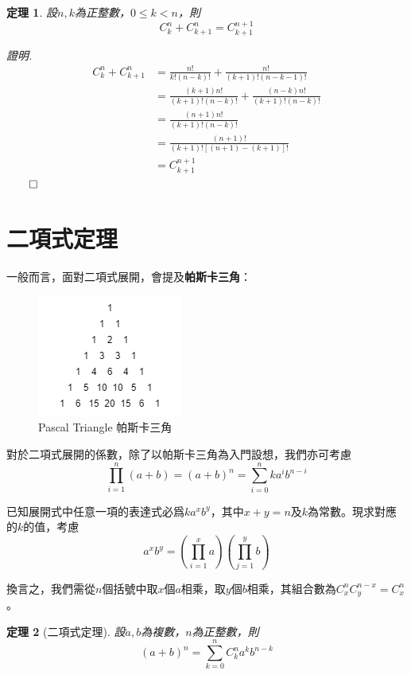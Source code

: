 \documentclass[12pt]{article}
\newtheorem*{theorem}{定理}
\renewenvironment*{proof}{\textit{證明.}}{\hfill$\qed$}
\begin{document}
    \begin{theorem}
        設$n,k$為正整數，$0\leq k< n$，則$$C_k^n+C_{k+1}^n=C_{k+1}^{n+1}$$
    \end{theorem}

    \begin{proof}
        \begin{align*}
            C_k^n+C_{k+1}^n&=\frac{n!}{k!(n-k)!}+\frac{n!}{(k+1)!(n-k-1)!}\\
            &=\frac{(k+1)n!}{(k+1)!(n-k)!}+\frac{(n-k)n!}{(k+1)!(n-k)!}\\
            &=\frac{(n+1)n!}{(k+1)!(n-k)!}\\
            &=\frac{(n+1)!}{(k+1)![(n+1)-(k+1)]!}\\
            &=C_{k+1}^{n+1}
        \end{align*}
    \end{proof}

    \section*{二項式定理}

    一般而言，面對二項式展開，會提及\textbf{帕斯卡三角}：

    \begin{figure}[H]
        \centering
        \includegraphics[scale=1]{pascal_triangle.png}
        \caption{Pascal Triangle 帕斯卡三角}
    \end{figure}

    對於二項式展開的係數，除了以帕斯卡三角為入門設想，我們亦可考慮$$\prod_{i=1}^{n}(a+b)=(a+b)^n=\sum_{i=0}^{n}ka^ib^{n-i}$$

    已知展開式中任意一項的表達式必爲$ka^xb^y$，其中$x+y=n$及$k$為常數。現求對應的$k$的值，考慮$$a^xb^y=(\prod_{i=1}^{x}a)(\prod_{j=1}^{y}b)$$

    換言之，我們需從$n$個括號中取$x$個$a$相乘，取$y$個$b$相乘，其組合數為$C_x^n C_y^{n-x}=C_x^n$。

    \begin{theorem}[二項式定理]
        設$a,b$為複數，$n$為正整數，則$$(a+b)^n=\sum_{k=0}^{n}C_k^n a^kb^{n-k}$$
    \end{theorem}
\end{document}
